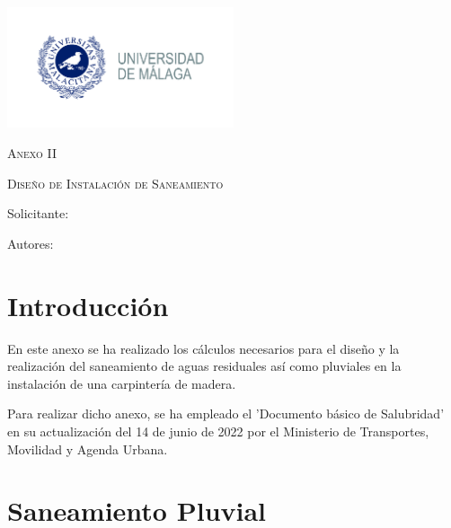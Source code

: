 \documentclass[../main.tex]{subfiles}
\begin{document}
\newpage
\thispagestyle{empty}
\begin{center}
    {\includegraphics[width=0.5\textwidth]{Imagenes/Logo UMA.jpg}\par}
    \vspace{1cm}
    {\bfseries\LARGE \Facultad \par}
    \vspace{0.5cm}
    {\scshape\Large \Grado \par}
    \vspace{1.5cm}
    {\scshape\Huge Anexo II \par}
    \vspace{0.5cm}
    {\scshape\Huge Diseño de Instalación de Saneamiento \par}
    \vspace{1.5cm}
    {\itshape\Large \TituloProyecto \par}
    \vfill
    {\Large Solicitante: \par}
    {\Large \Solicitante  \par}
    \vspace{1cm}
    {\Large Autores: \par}
    {\Large \Autora \par}
    {\Large \Autor \par}
    \vfill
    {\Large \Fecha \par}
\end{center}
\newpage

\section{Introducción}

En este anexo se ha realizado los cálculos necesarios para el diseño y la realización del saneamiento de aguas residuales así como pluviales en la instalación de una carpintería de madera.

Para realizar dicho anexo, se ha empleado el 'Documento básico de Salubridad' en su actualización del 14 de junio de 2022 por el Ministerio de Transportes, Movilidad y Agenda Urbana.

\section{Saneamiento Pluvial}
\end{document}
